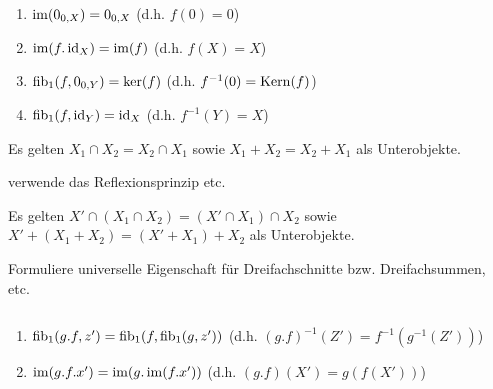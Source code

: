 \begin{lemm}[Regel (a)] $\quad$ %
\begin{enumerate}
\item $\operatorname{im}(0_{0,X}) = 0_{0,X}$ (d.h. $f(0) = 0$)
\item $\operatorname{im}(f.\operatorname{id}_X) = \operatorname{im}(f)$ (d.h. $f(X) = X$)
\item $\operatorname{fib}_1(f,0_{0,Y}) = \ker(f)$ (d.h. $f^{-1}(0) = \operatorname{Kern}(f)$)
\item $\operatorname{fib}_1(f,\operatorname{id}_Y) = \operatorname{id}_X$ (d.h. $f^{-1}(Y) = X$)
\end{enumerate}
\end{lemm}

\begin{lemm}[Regel (b)]
Es gelten $X_1 \cap X_2 = X_2 \cap X_1$
sowie $X_1 + X_2 = X_2 + X_1$ als Unterobjekte.
\end{lemm}
\begin{bew}
verwende das Reflexionsprinzip etc.
\end{bew}

\begin{lemm}[Regel (c)]
Es gelten $X' \cap (X_1 \cap X_2) = (X' \cap X_1) \cap X_2$ 
sowie $X' + (X_1 + X_2) = (X' + X_1) + X_2$ als Unterobjekte.
\end{lemm}
\begin{bew}
Formuliere universelle Eigenschaft für Dreifachschnitte bzw. Dreifachsummen, etc.
\end{bew}

\begin{lemm}[Regel (d)] $\quad$ %
\begin{enumerate}
\item $\operatorname{fib}_1(g.f, z') = \operatorname{fib}_1(f, \operatorname{fib}_1(g, z'))$ (d.h. $(g.f)^{-1}(Z') = f^{-1}(g^{-1}(Z'))$)
\item $\operatorname{im}(g.f.x') = \operatorname{im}(g.\operatorname{im}(f.x'))$ (d.h. $(g.f)(X') = g(f(X'))$)
\end{enumerate}
\end{lemm}

